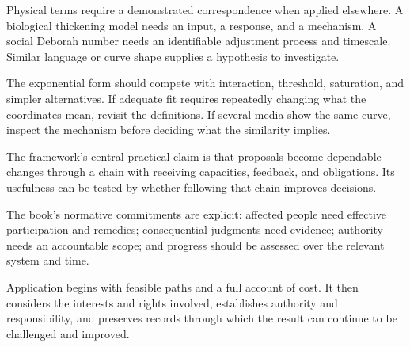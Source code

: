 \documentclass[11pt,openany]{book}
\begin{document}
Physical terms require a demonstrated correspondence when applied elsewhere. A biological thickening model needs an input, a response, and a mechanism. A social Deborah number needs an identifiable adjustment process and timescale. Similar language or curve shape supplies a hypothesis to investigate.

The exponential form should compete with interaction, threshold, saturation, and simpler alternatives. If adequate fit requires repeatedly changing what the coordinates mean, revisit the definitions. If several media show the same curve, inspect the mechanism before deciding what the similarity implies.

The framework's central practical claim is that proposals become dependable changes through a chain with receiving capacities, feedback, and obligations. Its usefulness can be tested by whether following that chain improves decisions.

The book's normative commitments are explicit: affected people need effective participation and remedies; consequential judgments need evidence; authority needs an accountable scope; and progress should be assessed over the relevant system and time.

Application begins with feasible paths and a full account of cost. It then considers the interests and rights involved, establishes authority and responsibility, and preserves records through which the result can continue to be challenged and improved.

\printbibliography[title={References}]
\end{document}
